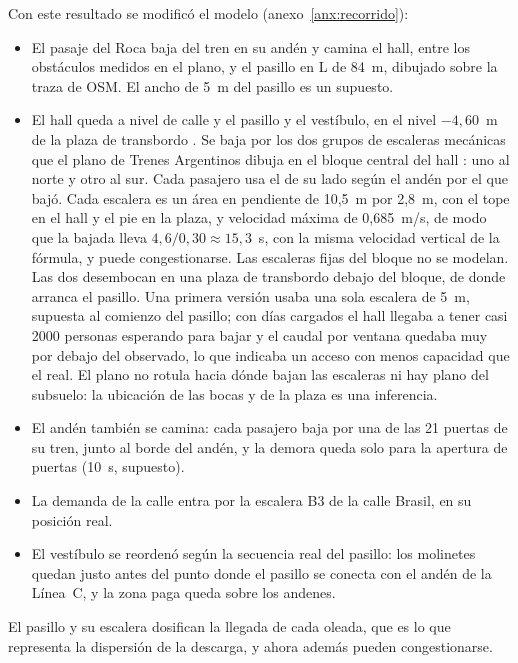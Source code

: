 Con este resultado se modificó el modelo (anexo~\ref{anx:recorrido}):
\begin{itemize}
  \item El pasaje del Roca baja del tren en su andén y camina el hall, entre los obstáculos medidos
        en el plano, y el pasillo en L de 84~m, dibujado sobre la traza de OSM. El ancho de 5~m del pasillo es
        un supuesto.
  \item El hall queda a nivel de calle y el pasillo y el vestíbulo, en el nivel $-4{,}60$~m de la plaza de
        transbordo \parencite{gcba2015transbordo}. Se baja por los dos grupos de escaleras mecánicas que el plano
        de Trenes Argentinos dibuja en el bloque central del hall \parencite{sofse2026nota}: uno al norte y otro
        al sur. Cada pasajero usa el de su lado según el andén por el que bajó. Cada escalera es un área en
        pendiente de 10,5~m por 2,8~m, con el tope en el hall y el pie en la plaza, y velocidad máxima de
        0,685~m/s, de modo que la bajada lleva $4{,}6/0{,}30 \approx 15{,}3$~s, con la misma velocidad vertical de
        la fórmula, y puede congestionarse. Las escaleras fijas del bloque no se modelan. Las dos desembocan en una plaza de transbordo debajo del bloque, de donde arranca
        el pasillo. Una primera versión usaba una sola escalera de 5~m, supuesta al comienzo del pasillo; con
        días cargados el hall llegaba a tener casi \num{2000} personas esperando para bajar y el caudal por
        ventana quedaba muy por debajo del observado, lo que indicaba un acceso con menos capacidad que el
        real. El plano no rotula hacia dónde bajan las escaleras ni hay plano del subsuelo: la ubicación de las
        bocas y de la plaza es una inferencia.
  \item El andén también se camina: cada pasajero baja por una de las 21 puertas de su tren, junto al borde
        del andén, y la demora queda solo para la apertura de puertas (10~s, supuesto).
  \item La demanda de la calle entra por la escalera B3 de la calle Brasil, en su posición real.
  \item El vestíbulo se reordenó según la secuencia real del pasillo: los molinetes quedan justo antes del
        punto donde el pasillo se conecta con el andén de la Línea~C, y la zona paga queda sobre los andenes.
\end{itemize}
El pasillo y su escalera dosifican la llegada de cada oleada, que es lo que representa la dispersión de la
descarga, y ahora además pueden congestionarse.


